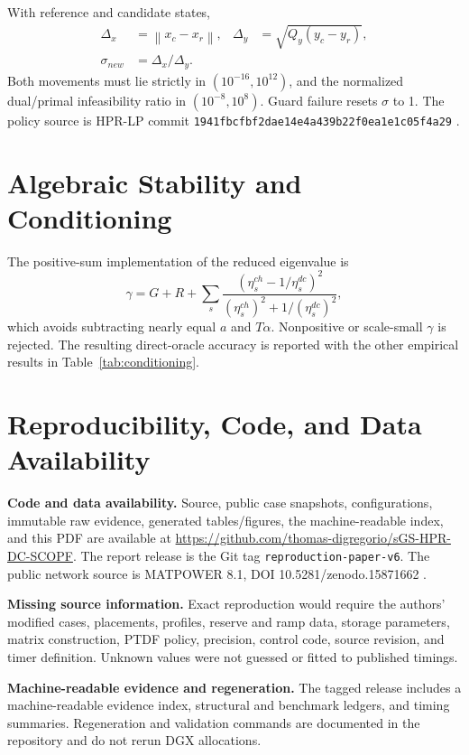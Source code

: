 \documentclass[10pt,journal]{IEEEtran}
\newcommand{\norm}[1]{\left\lVert #1\right\rVert}
\begin{document}
With reference and candidate states,
\begin{align}
\Delta_x&=\norm{x_c-x_r}, &
\Delta_y&=\sqrt{Q_y(y_c-y_r)}, \label{eq:policy-moves}\\
\sigma_{new}&=\Delta_x/\Delta_y. \label{eq:policy-sigma}
\end{align}
Both movements must lie strictly in $(10^{-16},10^{12})$, and the normalized
dual/primal infeasibility ratio in $(10^{-8},10^8)$. Guard failure resets
$\sigma$ to 1. The policy source is HPR-LP commit
\texttt{1941fbcfbf2dae14e4a439b22f0ea1e1c05f4a29}
\cite{chen2026}.

\section{Algebraic Stability and Conditioning}
\label{app:algebra}

The positive-sum implementation of the reduced eigenvalue is
\begin{equation}
\gamma=G+R+\sum_s
\frac{(\eta_s^{ch}-1/\eta_s^{dc})^2}
{(\eta_s^{ch})^2+1/(\eta_s^{dc})^2},
\end{equation}
which avoids subtracting nearly equal $a$ and $T\alpha$. Nonpositive or
scale-small $\gamma$ is rejected. The resulting direct-oracle accuracy is
reported with the other empirical results in Table~\ref{tab:conditioning}.

\section{Reproducibility, Code, and Data Availability}
\label{app:repro}

\textbf{Code and data availability.} Source, public case snapshots,
configurations, immutable raw evidence, generated tables/figures, the
machine-readable index, and this PDF are available at
\url{https://github.com/thomas-digregorio/sGS-HPR-DC-SCOPF}. The report
release is the Git tag \texttt{reproduction-paper-v6}. The public network
source is MATPOWER 8.1, DOI 10.5281/zenodo.15871662 \cite{matpower}.

\textbf{Missing source information.} Exact reproduction would require the
authors' modified cases, placements, profiles, reserve and ramp data, storage
parameters, matrix construction, PTDF policy, precision, control code, source
revision, and timer definition. Unknown values were not guessed or fitted to
published timings.

\textbf{Machine-readable evidence and regeneration.} The tagged release
includes a machine-readable evidence index, structural and benchmark ledgers,
and timing summaries. Regeneration and validation commands are
documented in the repository and do not rerun DGX allocations.
\end{document}
